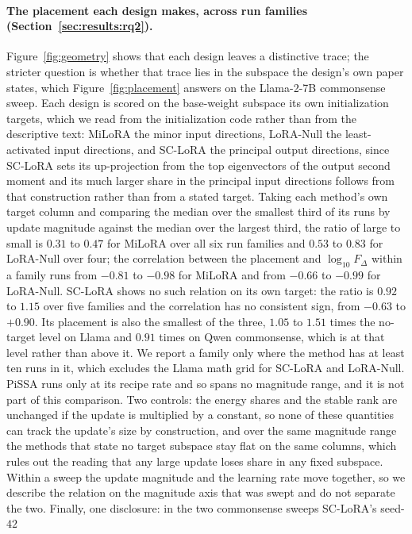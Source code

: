 \documentclass[11pt]{article}
\newcommand{\dw}{F_{\Delta}}
\begin{document}
\paragraph{The placement each design makes, across run families
(Section~\ref{sec:results:rq2}).} Figure~\ref{fig:geometry} shows that
each design leaves a distinctive trace; the stricter question is whether
that trace lies in the subspace the design's own paper states, which
Figure~\ref{fig:placement} answers on the
Llama-2-7B commonsense sweep. Each design is scored on the base-weight
subspace its own initialization targets, which we read from the
initialization code rather than from the descriptive text: MiLoRA the
minor input directions, LoRA-Null the least-activated input directions,
and SC-LoRA the principal output directions, since SC-LoRA sets its
up-projection from the top eigenvectors of the output second moment and
its much larger share in the principal input directions follows from that
construction rather than from a stated target. Taking each method's own
target column and comparing the median over the smallest third of its runs
by update magnitude against the median over the largest third, the ratio
of large to small is $0.31$ to $0.47$ for MiLoRA over all six run families
and $0.53$ to $0.83$ for LoRA-Null over four; the correlation between the
placement and $\log_{10}\dw$ within a family runs from $-0.81$ to $-0.98$
for MiLoRA and from $-0.66$ to $-0.99$ for LoRA-Null. SC-LoRA shows no
such relation on its own target: the ratio is $0.92$ to $1.15$ over five
families and the correlation has no consistent sign, from $-0.63$ to
$+0.90$. Its placement is also the smallest of the three, $1.05$ to $1.51$
times the no-target level on Llama and $0.91$ times on Qwen commonsense,
which is at that level rather than above it. We report a family only where
the method has at least ten runs in it, which excludes the Llama math grid
for SC-LoRA and LoRA-Null. PiSSA runs only at its recipe rate and so spans
no magnitude range, and it is not part of this comparison. Two controls: the energy shares and the
stable rank are unchanged if the update is multiplied by a constant, so
none of these quantities can track the update's size by construction, and
over the same magnitude range the methods that state no target subspace
stay flat on the same columns, which rules out the reading that any large
update loses share in any fixed subspace. Within a sweep the update
magnitude and the learning rate move together, so we describe the relation
on the magnitude axis that was swept and do not separate the two.
Finally, one disclosure: in the two commonsense sweeps SC-LoRA's seed-$42$
\end{document}

